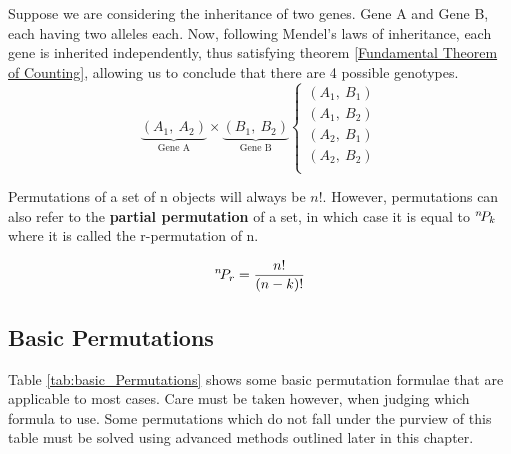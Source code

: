 \begin{wormhole}
    Suppose we are considering the inheritance of two genes. Gene A and Gene B, each having two alleles each. Now, following Mendel's laws of inheritance, each gene is inherited independently, thus satisfying theorem \ref{Fundamental Theorem of Counting}, allowing us to conclude that there are 4 possible genotypes.
    \begin{equation*}
        \underbrace{(A_1,\ A_2)}_\text{Gene A}\times\underbrace{(B_1,\ B_2)}_\text{Gene B} \begin{cases}
            (A_1,\ B_1) \\
            (A_1,\ B_2) \\
            (A_2,\ B_1) \\
            (A_2,\ B_2) \\
        \end{cases}
    \end{equation*}
\end{wormhole}

Permutations of a set of n objects will always be \mbox{$n!$}. However, permutations can also refer to the \textbf{partial permutation} of a set, in which case it is equal to \mbox{${}^{n}\!P_{k}$} where it is called the r-permutation of n. 

\begin{equation}
    {}^{n}\!P_{r} = \frac{n!}{(n-k)!}
\end{equation}

\subsection{Basic Permutations}
Table \ref{tab:basic_Permutations} shows some basic permutation formulae that are applicable to most cases. Care must be taken however, when judging which formula to use. Some permutations which do not fall under the purview of this table must be solved using advanced methods outlined later in this chapter.


